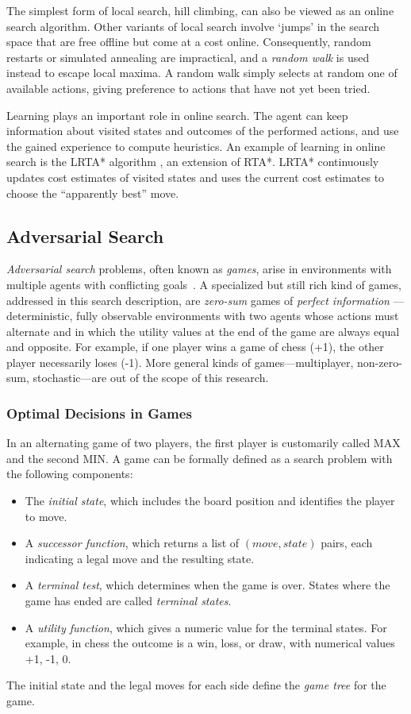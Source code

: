 The simplest form of local search, hill climbing, can also be
viewed as an online search algorithm. Other variants of local search
involve `jumps' in the search space that are free offline but come at
a cost online. Consequently, random restarts or simulated annealing
are impractical, and a {\em random walk} is used instead to escape
local maxima. A random walk simply selects at random one of available
actions, giving preference to actions that have not yet been tried.

Learning plays an important role in online search. The agent can keep
information about visited states and outcomes of the performed
actions, and use the gained experience to compute heuristics. An
example of learning in online search is the LRTA* algorithm
\cite{Korf.rta}, an extension of RTA*. LRTA* continuously
updates cost estimates of visited states and uses the current cost
estimates to choose the ``apparently best'' move.

\subsection{Adversarial Search}

{\em Adversarial search} problems, often known as {\em games}, arise
in environments with multiple agents with conflicting
goals~\cite{Russell.aima}. A specialized but still rich kind of games,
addressed in this search description, are {\em zero-sum} games of {\em
  perfect information} --- deterministic, fully observable
environments with two agents whose actions must alternate and in which
the utility values at the end of the game are always equal and
opposite. For example, if one player wins a game of chess (+1), the
other player necessarily loses (-1).  More general kinds of
games---multiplayer, non-zero-sum, stochastic---are out of the scope of
this research.

\subsubsection{Optimal Decisions in Games}

In an alternating game of two players, the first player is customarily
called MAX and the second MIN. A game can be formally defined as a
search problem with the following components:
\begin{itemize}
\item The {\em initial state}, which includes the board position and
  identifies the player to move.
\item A {\em successor function}, which returns a list of $(move,
  state)$ pairs, each indicating a legal move and the resulting state.
\item A {\em terminal test}, which determines when the game is
  over. States where the game has ended are called {\em terminal
    states}.
\item A {\em utility function}, which gives a numeric value for the
  terminal states. For example, in chess the outcome is a win, loss,
  or draw, with numerical values +1, -1, 0.
\end{itemize}
The initial state and the legal moves for each side define the {\em
  game tree} for the game.

